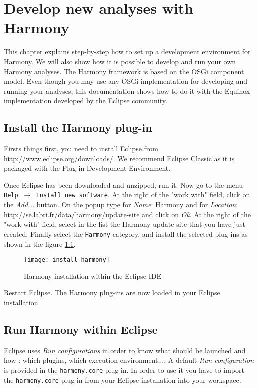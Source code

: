 \chapter{Develop new analyses with Harmony}\label{chap:DevelopNewAnalyses}

This chapter explains step-by-step how to set up a development environment for Harmony. We will also show how it is possible to develop and run your own Harmony analyses. The Harmony framework is based on the OSGi component model. Even though you may use any OSGi implementation for developing and running your analyses, this documentation shows how to do it with the Equinox implementation developed by the Eclipse community.


\section{Install the Harmony plug-in}
Firsts things first, you need to install Eclipse from \url{http://www.eclipse.org/downloads/}. We recommend Eclipse Classic as it is packaged with the Plug-in Development Environment.

Once Eclipse has been downloaded and unzipped, run it.  Now go to the menu \texttt{Help $\rightarrow$ Install new software}. At the right of the "work with" field, click on the \emph{Add...} button. On the popup type for \emph{Name}: Harmony and for \emph{Location}: \url{http://se.labri.fr/data/harmony/update-site} and click on \emph{Ok}. At the right of the "work with" field, select in the list the Harmony update site that you have just created. Finally select the \texttt{Harmony} category, and install the selected plug-ins as shown in the figure \ref{fig:harmonyInstall}. 

	\begin{figure}[H]
		\centering
		\texttt{[image: install-harmony]}
		\caption{Harmony installation within the Eclipse IDE}
		\label{fig:harmonyInstall}
	\end{figure}

Restart Eclipse. The Harmony plug-ins are now loaded in your Eclipse installation.

\section{Run Harmony within Eclipse}\label{sec:RunInEclipse}

Eclipse uses \emph{Run configurations} in order to know what should be launched and how : which plugins, which execution environment,... A default \emph{Run configuration} is provided in the \texttt{harmony.core} plug-in. In order to use it you have to import the \texttt{harmony.core} plug-in from your Eclipse installation into your workspace. 

